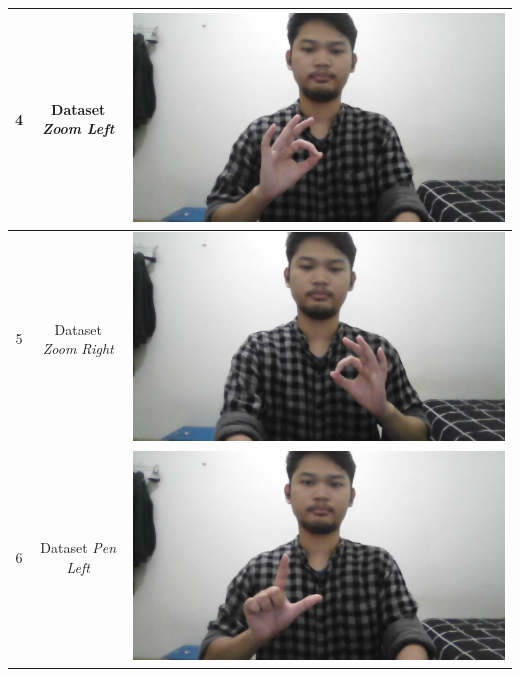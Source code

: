 \begin{longtable}{|c|c|c|}
  \hline
  4 & Dataset \emph{Zoom Left}  &  \includegraphics[scale=0.2]{gambar/pengambilan-dataset/dataset-zoom-left.jpg} \\
  \hline
  5 & Dataset \emph{Zoom Right}  &  \includegraphics[scale=0.2]{gambar/pengambilan-dataset/dataset-zoom-right.jpg} \\
  \hline
  6 & Dataset \emph{Pen Left}  &  \includegraphics[scale=0.2]{gambar/pengambilan-dataset/dataset-pen-left.jpg} \\

\end{longtable}
